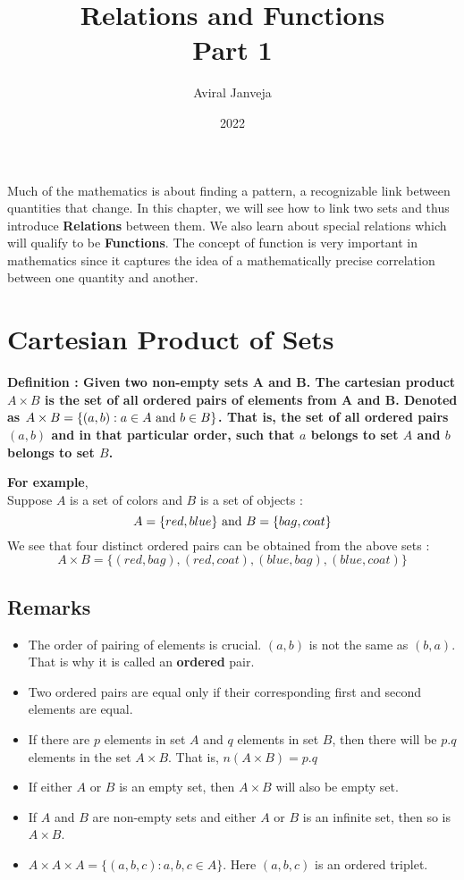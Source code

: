 \documentclass[12pt, letterpaper]{article}
\title{\textbf{\Huge Relations and Functions \\ Part 1}}
\author{Aviral Janveja}
\date{2022}
\begin{document}
\maketitle

Much of the mathematics is about finding a pattern, a recognizable link between quantities that change. In this chapter, we will see how to link two sets and thus introduce \textbf{Relations} between them. We also learn about special relations which will qualify to be \textbf{Functions}. The concept of function is very important in mathematics since it captures the idea of a mathematically precise correlation between one quantity and another.


\section{Cartesian Product of Sets}
\begin{displayquote}
\textbf{Definition : Given two non-empty sets A and B. The cartesian product $A \times B$ is the set of all ordered pairs of elements from A and B. Denoted as $A \times B = \{ (a,b): a \in A \ \textnormal{and} \ b \in B \}$. That is, the set of all ordered pairs $(a,b)$ and in that particular order, such that $a$ belongs to set $A$ and $b$ belongs to set $B$.}
\end{displayquote}
\textbf{For example},\\
Suppose $A$ is a set of colors and $B$ is a set of objects : 
\begin{displaymath}
A = \{red, blue\} \textnormal{ and } B = \{bag, coat\}
\end{displaymath}
We see that four distinct ordered pairs can be obtained from the above sets : 
\begin{displaymath}
A \times B = \{(red,bag), (red, coat), (blue, bag), (blue, coat)\}
\end{displaymath}

\subsection{Remarks}
\begin{itemize}
    \item The order of pairing of elements is crucial. $(a,b)$ is not the same as $(b,a)$. That is why it is called an \textbf{ordered} pair.
    \item Two ordered pairs are equal only if their corresponding first and second elements are equal.
    \item If there are $p$ elements in set $A$ and $q$ elements in set $B$, then there will be $p.q$ elements in the set $A \times B$. That is, $n(A \times B) = p.q$
    \item If either $A$ or $B$ is an empty set, then $A \times B$ will also be empty set.
    \item If $A$ and $B$ are non-empty sets and either $A$ or $B$ is an infinite set, then so is $A \times B$.
    \item $A \times A \times A = \{(a,b,c): a,b,c \in A\}$. Here $(a,b,c)$ is an ordered triplet.
\end{itemize}
\end{document}

